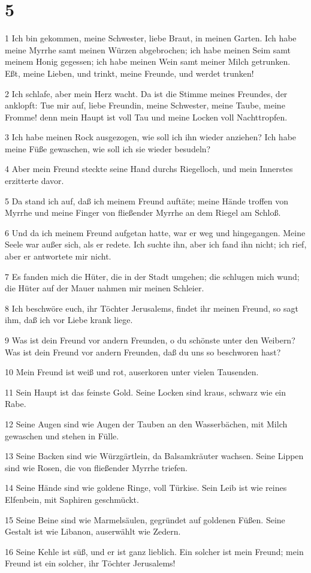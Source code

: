 \chapter{5}

\par 1 Ich bin gekommen, meine Schwester, liebe Braut, in meinen Garten. Ich habe meine Myrrhe samt meinen Würzen abgebrochen; ich habe meinen Seim samt meinem Honig gegessen; ich habe meinen Wein samt meiner Milch getrunken. Eßt, meine Lieben, und trinkt, meine Freunde, und werdet trunken!
\par 2 Ich schlafe, aber mein Herz wacht. Da ist die Stimme meines Freundes, der anklopft: Tue mir auf, liebe Freundin, meine Schwester, meine Taube, meine Fromme! denn mein Haupt ist voll Tau und meine Locken voll Nachttropfen.
\par 3 Ich habe meinen Rock ausgezogen, wie soll ich ihn wieder anziehen? Ich habe meine Füße gewaschen, wie soll ich sie wieder besudeln?
\par 4 Aber mein Freund steckte seine Hand durchs Riegelloch, und mein Innerstes erzitterte davor.
\par 5 Da stand ich auf, daß ich meinem Freund auftäte; meine Hände troffen von Myrrhe und meine Finger von fließender Myrrhe an dem Riegel am Schloß.
\par 6 Und da ich meinem Freund aufgetan hatte, war er weg und hingegangen. Meine Seele war außer sich, als er redete. Ich suchte ihn, aber ich fand ihn nicht; ich rief, aber er antwortete mir nicht.
\par 7 Es fanden mich die Hüter, die in der Stadt umgehen; die schlugen mich wund; die Hüter auf der Mauer nahmen mir meinen Schleier.
\par 8 Ich beschwöre euch, ihr Töchter Jerusalems, findet ihr meinen Freund, so sagt ihm, daß ich vor Liebe krank liege.
\par 9 Was ist dein Freund vor andern Freunden, o du schönste unter den Weibern? Was ist dein Freund vor andern Freunden, daß du uns so beschworen hast?
\par 10 Mein Freund ist weiß und rot, auserkoren unter vielen Tausenden.
\par 11 Sein Haupt ist das feinste Gold. Seine Locken sind kraus, schwarz wie ein Rabe.
\par 12 Seine Augen sind wie Augen der Tauben an den Wasserbächen, mit Milch gewaschen und stehen in Fülle.
\par 13 Seine Backen sind wie Würzgärtlein, da Balsamkräuter wachsen. Seine Lippen sind wie Rosen, die von fließender Myrrhe triefen.
\par 14 Seine Hände sind wie goldene Ringe, voll Türkise. Sein Leib ist wie reines Elfenbein, mit Saphiren geschmückt.
\par 15 Seine Beine sind wie Marmelsäulen, gegründet auf goldenen Füßen. Seine Gestalt ist wie Libanon, auserwählt wie Zedern.
\par 16 Seine Kehle ist süß, und er ist ganz lieblich. Ein solcher ist mein Freund; mein Freund ist ein solcher, ihr Töchter Jerusalems!

